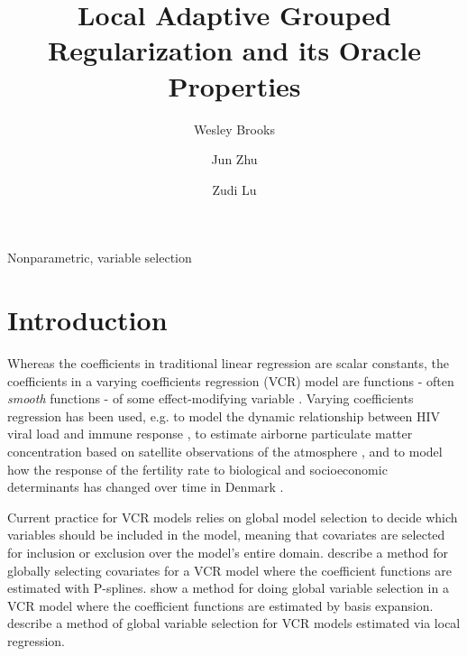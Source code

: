 \documentclass[authoryear,review, 12pt]{elsarticle}
\begin{document}
\begin{frontmatter}

\title{Local Adaptive Grouped Regularization and its Oracle Properties}


\author[wrbrooks]{Wesley Brooks}

\author[jzhu]{Jun Zhu}

\author[zlu]{Zudi Lu}

\address[wrbrooks]{Department of Statistics, University of Wisconsin, Madison, WI 53706}
\address[jzhu]{Department of Statistics and Department of Entomology, University of Wisconsin, Madison, WI 53706}
\address[zlu]{School of Mathematical Sciences, The university of Adelaide, Australia}

\begin{abstract}

\end{abstract}

\begin{keyword}
Nonparametric, variable selection
\end{keyword}

\end{frontmatter}


\section{Introduction}

Whereas the coefficients in traditional linear regression are scalar
constants, the coefficients in a varying coefficients regression (VCR)
model are functions - often \emph{smooth} functions - of some effect-modifying
variable \citep{Cleveland-Grosse-1991,Hastie-Tibshirani-1993}. Varying
coefficients regression has been used, e.g. to model the dynamic relationship
between HIV viral load and immune response \citep{Liang-Wu-Carroll-2003},
to estimate airborne particulate matter concentration based on satellite
observations of the atmosphere \citep{Pelletier-Santer-Vidot-2007},
and to model how the response of the fertility rate to biological
and socioeconomic determinants has changed over time in Denmark \citep{Kohler-Rodgers-Christensen-2003}.

Current practice for VCR models relies on global model selection to
decide which variables should be included in the model, meaning that
covariates are selected for inclusion or exclusion over the model's
entire domain. \citet{Antoniadis:2012a} describe a method for globally
selecting covariates for a VCR model where the coefficient functions
are estimated with P-splines. \citet{Wang-2008a} show a method for
doing global variable selection in a VCR model where the coefficient
functions are estimated by basis expansion. \citet{Wang-Xia-2009}
describe a method of global variable selection for VCR models estimated
via local regression.
\end{document}
